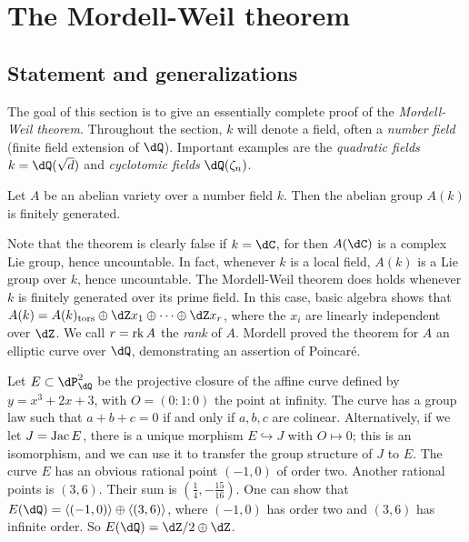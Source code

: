 









\section{The Mordell-Weil theorem}





\subsection{Statement and generalizations}

The goal of this section is to give an essentially complete proof of the 
\emph{Mordell-Weil theorem}. Throughout the section, $k$ will denote a 
field, often a \emph{number field} (finite field extension of $\dQ$). 
Important examples are the \emph{quadratic fields} $k=\dQ(\sqrt d)$ and 
\emph{cyclotomic fields} $\dQ(\zeta_n)$. 

\begin{theorem}
Let $A$ be an abelian variety over a number field $k$. Then the abelian group 
$A(k)$ is finitely generated.
\end{theorem}

Note that the theorem is clearly false if $k=\dC$, for then $A(\dC)$ is a complex Lie 
group, hence uncountable. In fact, whenever $k$ is a local field, $A(k)$ is a 
Lie group over $k$, hence uncountable. The Mordell-Weil theorem does holds 
whenever $k$ is finitely generated over its prime field. In this case, basic algebra shows 
that $A(k) = A(k)_\text{tors}\oplus \dZ x_1\oplus \cdots \oplus \dZ x_r$, where 
the $x_i$ are linearly independent over $\dZ$. We call $r=\operatorname{rk} A$ 
the \emph{rank} of $A$. Mordell proved the theorem for $A$ an elliptic 
curve over $\dQ$, demonstrating an assertion of Poincar\'e.

\begin{example}
Let $E\subset \dP_\dQ^2$ be the projective closure of the affine curve 
defined by $y=x^3+2 x+3$, with $O=(0:1:0)$ the point at infinity. The curve 
has a group law such that $a+b+c=0$ if and only if $a,b,c$ are colinear. 
Alternatively, if we let $J=\operatorname{Jac} E$, there is a unique morphism 
$E\hookrightarrow J$ with $O\mapsto 0$; 
this is an isomorphism, and we can use it to transfer the group structure of 
$J$ to $E$. The curve $E$ has an obvious rational point $(-1,0)$ of order 
two. Another rational points is $(3,6)$. Their sum is 
$\left(\frac 1 4,-\frac{15}{16}\right)$. One can show that 
$E(\dQ) = \langle (-1,0)\rangle \oplus \langle (3,6)\rangle$, where 
$(-1,0)$ has order two and $(3,6)$ has infinite order. So 
$E(\dQ) = \dZ/2\oplus \dZ$. 
\end{example}


